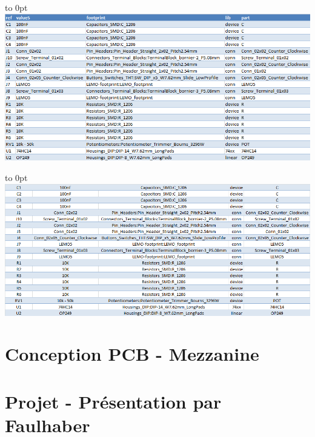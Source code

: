 \documentclass[french,a4paper,12pt]{report}
\begin{document}
		\hfill\hbox to 0pt{\hss\includegraphics[width=15cm]{AOP_Liste_Compos.png}\hss}\hfill\null\newline
		
		\hfill\hbox to 0pt{\hss\includegraphics[width=15cm]{AOP_ListeComposants.png}\hss}\hfill\null\newline
		
	\chapter{Conception PCB - Mezzanine}
		
			
		
		
		
			
		
	\chapter{Projet - Présentation par Faulhaber}
		
			
		
\end{document}
